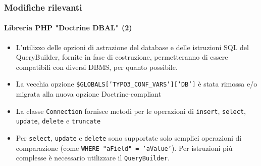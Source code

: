 \begin{frame}[fragile]
	\frametitle{Modifiche rilevanti}
	\framesubtitle{Libreria PHP "Doctrine DBAL" (2)}

	\begin{itemize}

		\item L'utilizzo delle opzioni di astrazione del database e delle istruzioni SQL del
		QueryBuilder, fornite in fase di costruzione, permetteranno di essere compatibili con
		diversi DBMS, per quanto possibile.

		\item La vecchia opzione \texttt{\$GLOBALS['TYPO3\_CONF\_VARS']['DB']} è stata rimossa
			e/o migrata alla nuova opzione Doctrine-compliant

		\item La classe \texttt{Connection} fornisce metodi per le operazioni di 
			\texttt{insert}, \texttt{select}, \texttt{update}, \texttt{delete} e
			\texttt{truncate}

		\item Per \texttt{select}, \texttt{update} e \texttt{delete} sono supportate solo
			semplici operazioni di comparazione (come \texttt{WHERE "aField" = 'aValue'}).
			Per istruzioni più complesse è necessario utilizzare il \texttt{QueryBuilder}.

	\end{itemize}

\end{frame}

